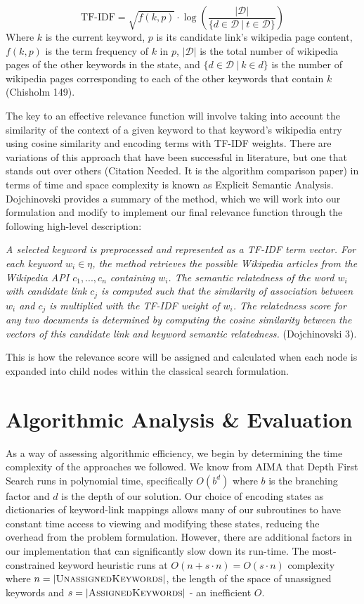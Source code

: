 \documentclass[twoside,11pt]{article}
\begin{document}
$$\mbox{TF-IDF} = \sqrt{f(k, p)} \cdot \log \left( \frac{|\mathcal{D}|}{\{d \in \mathcal{D} \ | \ t \in \mathcal{D}\}} \right) $$
Where $k$ is the current keyword, $p$ is its candidate link's wikipedia page content, $f(k,p)$ is the term frequency of $k$ in $p$, $|\mathcal{D}|$ is the total number of wikipedia pages of the other keywords in the state, and $\{d \in \mathcal{D} \ | \ k \in d\}$ is the number of wikipedia pages corresponding to each of the other keywords that contain $k$ (Chisholm 149).

The key to an effective relevance function will involve taking into account the similarity of the context of a given keyword to that keyword’s wikipedia entry using cosine similarity and encoding terms with TF-IDF weights. There are variations of this approach that have been successful in literature, but one that stands out over others (Citation Needed. It is the algorithm comparison paper) in terms of time and space complexity is known as Explicit Semantic Analysis. Dojchinovski provides a summary of the method, which we will work into our formulation and modify to implement our final relevance function through the following high-level description:

\textit{A selected keyword is preprocessed and represented as a TF-IDF term vector. For each keyword $w_i \in \eta$, the method retrieves the possible Wikipedia articles from the Wikipedia API $c_1,... ,c_n$ containing $w_i$. The semantic relatedness of the word $w_i$ with candidate link $c_j$ is computed such that the similarity of association between $w_i$ and $c_j$ is multiplied with the TF-IDF weight of $w_i$. The relatedness score for any two documents is determined by computing the cosine similarity between the vectors of this candidate link and keyword semantic relatedness.} (Dojchinovski 3).

This is how the relevance score will be assigned and calculated when each node is expanded into child nodes within the classical search formulation.

\section{Algorithmic Analysis \& Evaluation}
As a way of assessing algorithmic efficiency, we begin by determining the time complexity of the approaches we followed. We know from AIMA that Depth First Search runs in polynomial time, specifically $O(b^d)$ where $b$ is the branching factor and $d$ is the depth of our solution. Our  choice of encoding states as dictionaries of keyword-link mappings allows many of our subroutines to have constant time access to viewing and modifying these states, reducing the overhead from the problem formulation. However, there are additional factors in our implementation that can significantly slow down its run-time. The most-constrained keyword heuristic runs at $O(n + s\cdot n) = O(s\cdot n)$ complexity where $n = |\mbox{{\sc UnassignedKeywords}}|$, the length of the space of unassigned keywords and $s = |\mbox{{\sc AssignedKeywords}}|$ - an inefficient $O$.
\end{document}
